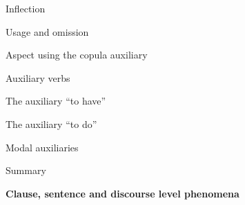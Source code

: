 \begin{listWWNumixleveli}
\begin{listWWNumixlevelii}
\setcounter{listWWNumixleveliii}{0}
\begin{listWWNumixleveliii}
\item 
\begin{styleListParagraph}
Inflection 
\end{styleListParagraph}
\item 
\begin{styleListParagraph}
Usage and omission 
\end{styleListParagraph}
\item 
\begin{styleListParagraph}
Aspect using the copula auxiliary 
\end{styleListParagraph}
\end{listWWNumixleveliii}
\item 
\begin{styleListParagraph}
Auxiliary verbs 
\end{styleListParagraph}


\setcounter{listWWNumixleveliii}{0}
\begin{listWWNumixleveliii}
\item 
\begin{styleListParagraph}
The auxiliary “to have” 
\end{styleListParagraph}
\item 
\begin{styleListParagraph}
The auxiliary “to do” 
\end{styleListParagraph}
\item 
\begin{styleListParagraph}
Modal auxiliaries
\end{styleListParagraph}
\end{listWWNumixleveliii}
\item 
\begin{styleListParagraph}
Summary
\end{styleListParagraph}
\end{listWWNumixlevelii}
\end{listWWNumixleveli}

\setcounter{listWWNumiileveli}{0}
\begin{listWWNumiileveli}
\item 
\begin{styleListParagraph}
\textbf{Clause, sentence and discourse level phenomena }
\end{styleListParagraph}
\end{listWWNumiileveli}

